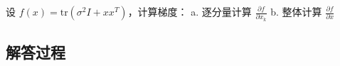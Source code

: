 \begin{example}[迹函数梯度]
    设 \(f(x) = \text{tr}(\sigma^2 I + xx^T)\)，计算梯度：  
    a. 逐分量计算 \(\frac{\partial f}{\partial x_k}\)  
    b. 整体计算 \(\frac{\partial f}{\partial x}\)
    \end{example}
    
    \subsection*{解答过程}
    